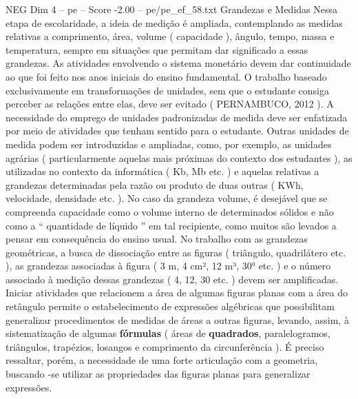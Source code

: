 \begin{textsample}{NEG Dim 4 – pe – Score -2.00 – pe/pe\_ef\_58.txt}  \label{ex:f4_neg_013}
Grandezas e Medidas Nessa etapa de escolaridade, a ideia de medição é ampliada, contemplando as medidas relativas a comprimento, área, volume ( capacidade ), ângulo, tempo, massa e temperatura, sempre em situações que permitam dar significado a essas grandezas.
As atividades envolvendo o sistema monetário devem dar continuidade ao que foi feito nos anos iniciais do ensino fundamental.
O trabalho baseado exclusivamente em transformações de unidades, sem que o estudante consiga perceber as relações entre elas, deve ser evitado ( PERNAMBUCO, 2012 ).
A necessidade do emprego de unidades padronizadas de medida deve ser enfatizada por meio de atividades que tenham sentido para o estudante.
Outras unidades de medida podem ser introduzidas e ampliadas, como, por exemplo, as unidades agrárias ( particularmente aquelas mais próximas do contexto dos estudantes ), as utilizadas no contexto da informática ( Kb, Mb etc. ) e aquelas relativas a grandezas determinadas pela razão ou produto de duas outras ( KWh, velocidade, densidade etc. ).
No caso da grandeza volume, é desejável que se compreenda capacidade como o volume interno de determinados sólidos e não como a “ quantidade de líquido ” em tal recipiente, como muitos são levados a pensar em consequência do ensino usual.
No trabalho com as grandezas geométricas, a busca de dissociação entre as figuras ( triângulo, quadrilátero etc. ), as grandezas associadas à figura ( 3 m, 4 cm², 12 m³, 30{\EmojiFont °} etc. ) e o número associado à medição dessas grandezas ( 4, 12, 30 etc. ) devem ser amplificadas.
Iniciar atividades que relacionem a área de algumas figuras planas com a área do retângulo permite o estabelecimento de expressões algébricas que possibilitam generalizar procedimentos de medidas de áreas a outras figuras, levando, assim, à sistematização de algumas \textbf{fórmulas} ( áreas de \textbf{quadrados}, paralelogramos, triângulos, trapézios, losangos e comprimento da circunferência ).
É preciso ressaltar, porém, a necessidade de uma forte articulação com a geometria, buscando -se utilizar as propriedades das figuras planas para generalizar expressões.

\end{textsample}
